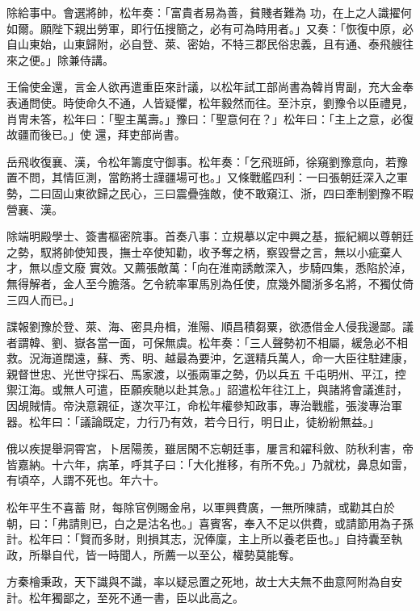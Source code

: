 \begin{pinyinscope}
 除給事中。會選將帥，松年奏：「富貴者易為善，貧賤者難為
 功，在上之人識擢何如爾。願陛下親出勞軍，即行伍搜簡之，必有可為時用者。」又奏：「恢復中原，必自山東始，山東歸附，必自登、萊、密始，不特三郡民俗忠義，且有通、泰飛艘往來之便。」除兼侍講。



 王倫使金還，言金人欲再遣重臣來計議，以松年試工部尚書為韓肖冑副，充大金奉表通問使。時使命久不通，人皆疑懼，松年毅然而往。至汴京，劉豫令以臣禮見，肖冑未答，松年曰：「聖主萬壽。」豫曰：「聖意何在？」松年曰：「主上之意，必復故疆而後已。」使
 還，拜吏部尚書。



 岳飛收復襄、漢，令松年籌度守御事。松年奏：「乞飛班師，徐窺劉豫意向，若豫置不問，其情叵測，當飭將士謹疆場可也。」又條戰艦四利：一曰張朝廷深入之軍勢，二曰固山東欲歸之民心，三曰震疊強敵，使不敢窺江、浙，四曰牽制劉豫不暇營襄、漢。



 除端明殿學士、簽書樞密院事。首奏八事：立規摹以定中興之基，振紀綱以尊朝廷之勢，馭將帥使知畏，撫士卒使知勸，收予奪之柄，察毀譽之言，無以小疵棄人才，無以虛文廢
 實效。又薦張敵萬：「向在淮南誘敵深入，步騎四集，悉陷於淖，無得解者，金人至今膽落。乞令統率軍馬別為任使，庶幾外閫浙多名將，不獨仗倚三四人而已。」



 諜報劉豫於登、萊、海、密具舟楫，淮陽、順昌積芻粟，欲憑借金人侵我邊鄙。議者謂韓、劉、嶽各當一面，可保無虞。松年奏：「三人聲勢初不相屬，緩急必不相救。況海道闊遠，蘇、秀、明、越最為要沖，乞選精兵萬人，命一大臣往駐建康，親督世忠、光世守採石、馬家渡，以張兩軍之勢，仍以兵五
 千屯明州、平江，控禦江海。或無人可遣，臣願疾馳以赴其急。」詔遣松年往江上，與諸將會議進討，因覘賊情。帝決意親征，遂次平江，命松年權參知政事，專治戰艦，張浚專治軍器。松年曰：「議論既定，力行乃有效，若今日行，明日止，徒紛紛無益。」



 俄以疾提舉洞霄宮，卜居陽羨，雖居閑不忘朝廷事，屢言和糴科斂、防秋利害，帝皆嘉納。十六年，病革，呼其子曰：「大化推移，有所不免。」乃就枕，鼻息如雷，有頃卒，人謂不死也。年六十。



 松年平生不喜蓄
 財，每除官例賜金帛，以軍興費廣，一無所陳請，或勸其白於朝，曰：「弗請則已，白之是沽名也。」喜賓客，奉入不足以供費，或請節用為子孫計。松年曰：「賢而多財，則損其志，況俸廩，主上所以養老臣也。」自持囊至執政，所舉自代，皆一時聞人，所薦一以至公，權勢莫能奪。



 方秦檜秉政，天下識與不識，率以疑忌置之死地，故士大夫無不曲意阿附為自安計。松年獨鄙之，至死不通一書，臣以此高之。




\end{pinyinscope}

